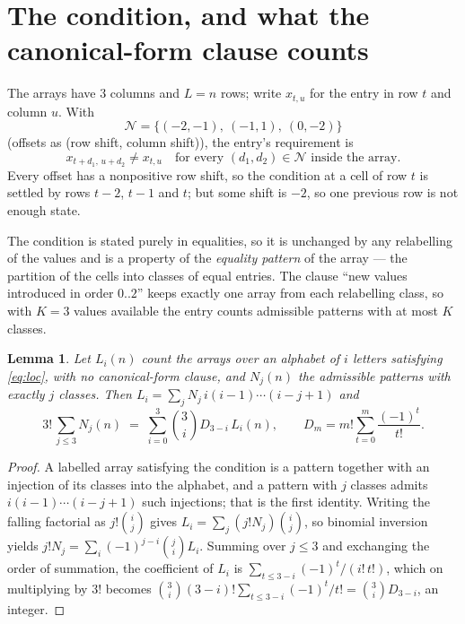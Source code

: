 \documentclass[11pt,a4paper]{article}
\theoremstyle{plain}
\newtheorem{lemma}[theorem]{Lemma}
\theoremstyle{definition}
\begin{document}
\section{The condition, and what the canonical-form clause counts}

The arrays have $3$ columns and $L=n$ rows; write $x_{t,u}$ for the entry in
row $t$ and column $u$. With
\[
\mathcal N=\{(-2,-1),\ (-1,1),\ (0,-2)\}
\]
(offsets as (row shift, column shift)), the entry's requirement is
\begin{equation}\label{eq:loc}
x_{t+d_1,\,u+d_2}\ne x_{t,u}\quad\text{for every }(d_1,d_2)\in\mathcal N\text{ inside the array}.
\end{equation}
Every offset has a nonpositive row shift, so the condition at a cell of row $t$ is
settled by rows $t-2$, $t-1$ and $t$; but some shift is $-2$, so one previous row is not
enough state.

The condition is stated purely in equalities, so it is unchanged by any relabelling of the
values and is a property of the \emph{equality pattern} of the array --- the partition of
the cells into classes of equal entries. The clause ``new values introduced in order
$0..2$'' keeps exactly one array from each relabelling class, so with $K=3$ values
available the entry counts admissible patterns with at most $K$ classes.

\begin{lemma}\label{lem:inv}
Let $L_i(n)$ count the arrays over an alphabet of $i$ letters satisfying \eqref{eq:loc},
with no canonical-form clause, and $N_j(n)$ the admissible patterns with exactly $j$ classes.
Then $L_i=\sum_j N_j\,i(i-1)\cdots(i-j+1)$ and
\[
3!\,\sum_{j\le 3}N_j(n)\;=\;\sum_{i=0}^{3}\binom{3}{i}D_{3-i}\,L_i(n),
\qquad D_m=m!\sum_{t=0}^{m}\frac{(-1)^t}{t!} .
\]
\end{lemma}

\begin{proof}
A labelled array satisfying the condition is a pattern together with an injection of its
classes into the alphabet, and a pattern with $j$ classes admits $i(i-1)\cdots(i-j+1)$ such
injections; that is the first identity. Writing the falling factorial as $j!\binom{i}{j}$
gives $L_i=\sum_j(j!N_j)\binom{i}{j}$, so binomial inversion yields
$j!N_j=\sum_i(-1)^{j-i}\binom{j}{i}L_i$. Summing over $j\le3$ and exchanging the
order of summation, the coefficient of $L_i$ is $\sum_{t\le3-i}(-1)^t/(i!\,t!)$, which on
multiplying by $3!$ becomes
$\binom{3}{i}(3-i)!\sum_{t\le3-i}(-1)^t/t!=\binom{3}{i}D_{3-i}$, an
integer.
\end{proof}
\end{document}
